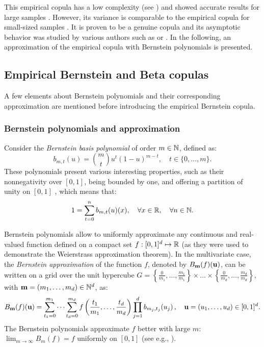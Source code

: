 This empirical copula has a low complexity (see \citealp{rose_2015}) and showed accurate results for large samples \citep{gonzalez_2021_checkerboard_copula}. 
However, its variance is comparable to the empirical copula for small-sized samples \citep{segers_2017}. 
It is proven to be a genuine copula and its asymptotic behavior was studied by various authors such as \citet{li_1998_checkerboard} or \citet{genest_2017_asymptotic_checkerboard}. 
In the following, an approximation of the empirical copula with Bernstein polynomials is presented. 



\subsection{Empirical Bernstein and Beta copulas}\label{sec:3ebc}
A few elements about Bernstein polynomials and their corresponding approximation are mentioned before introducing the empirical Bernstein copula.

\subsubsection{Bernstein polynomials and approximation}
Consider the \textit{Bernstein basis polynomial} of order $m \in \mathbb{N}$, defined as: 
\begin{equation}
    b_{m, t}(u)= \binom{m}{t}u^t(1-u)^{m-t}, \quad t \in \{0, \dots, m\}.
\end{equation}
These polynomials present various interesting properties, such as their nonnegativity over $[0, 1]$, being bounded by one, and offering a partition of unity on $[0, 1]$ \citep{lasserre_2023_bernstein}, which means that: 
\begin{equation}
    1 = \sum_{t=0}^{n} b_{m, t}(u)(x), \quad \forall x\in\mathbb{R}, \quad \forall n \in \mathbb{N}.
\end{equation} 

Bernstein polynomials allow to uniformly approximate any continuous and real-valued function defined on a compact set $f: [0, 1]^d \mapsto \mathbb{R}$ (as they were used to demonstrate the Weierstrass approximation theorem). 
In the multivariate case, the \textit{Bernstein approximation} of the function $f$, denoted by $B_{{\bf m}}(f)({\bf u})$, can be written on a grid over the unit hypercube $G=\left\{\frac{0}{m_1}, \dots, \frac{m_1}{m_1}\right\} \times \dots \times \left\{\frac{0}{m_d}, \dots, \frac{m_d}{m_d}\right\}$, with ${\bf m} = (m_1, \dots, m_d) \in \mathbb{N}^d$, as: 
\begin{equation}
    B_{{\bf m}}(f)({\bf u}) = \sum_{t_1=0}^{m_1} \dots \sum_{t_d=0}^{m_d} f\left(\frac{t_1}{m_1}, \dots, \frac{t_d}{m_d}\right) \prod_{j=1}^d b_{m_j, t_j}(u_j) \, , \quad  {\bf u} = (u_1, \dots, u_d) \in [0, 1]^d.
    \label{eq:bernstein_approx}
\end{equation}
The Bernstein polynomials approximate $f$ better with large $m$: $\lim_{m\to\infty} B_{m}(f) = f$ uniformly on $\left[0,1\right]$ (see e.g., \citealp{davis1975interpolation}). 


